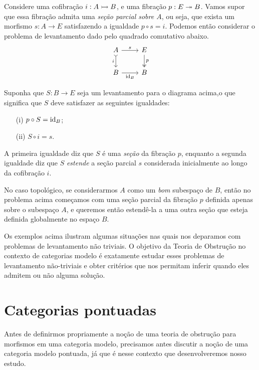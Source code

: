 \begin{exem}
  Considere uma cofibração $i: A \rightarrowtail B$, e uma fibração $p: E \twoheadrightarrow B$.
  Vamos supor que essa fibração admita uma \emph{seção parcial sobre $A$}, ou seja, que exista um morfismo $s: A \to E$ satisfazendo a igualdade $p \circ s = i$.
  Podemos então considerar o problema de levantamento dado pelo quadrado comutativo abaixo.
  \begin{displaymath}
    \begin{tikzcd}
      A
      \arrow[d, tail, "i" swap]
      \arrow[r, "s"]
      & E
      \arrow[d, two heads, "p"]
      \\ B
      \arrow[r, "\id_{B}" swap]
      & B
    \end{tikzcd}
  \end{displaymath}

  Suponha que $S: B \to E$ seja um levantamento para o diagrama acima,o que significa que $S$ deve satisfazer as seguintes igualdades:
  \begin{enumerate}
  \item[(i)] $p \circ S = \mathrm{id}_{B}$;
    
  \item[(ii)] $S \circ i = s$.
  \end{enumerate}
  A primeira igualdade diz que $S$ é uma \emph{seção} da fibração $p$, enquanto a segunda igualdade diz que $S$ \emph{estende} a seção parcial $s$ considerada inicialmente ao longo da cofibração $i$.

  No caso topológico, se considerarmos $A$ como um \emph{bom} subespaço de $B$, então no problema acima começamos com uma seção parcial da fibração $p$ definida apenas sobre o subespaço $A$, e queremos então estendê-la a uma outra seção que esteja definida globalmente no espaço $B$.
\end{exem}

Os exemplos acima ilustram algumas situações nas quais nos deparamos com problemas de levantamento não triviais.
O objetivo da Teoria de Obstrução no contexto de categorias modelo é exatamente estudar esses problemas de levantamento não-triviais e obter critérios que nos permitam inferir quando eles admitem ou não alguma solução.

\section{Categorias pontuadas}

Antes de definirmos propriamente a noção de uma teoria de obstrução para morfismos em uma categoria modelo, precisamos antes discutir a noção de uma categoria modelo pontuada, já que é nesse contexto que desenvolveremos nosso estudo.

